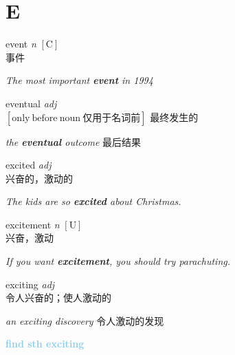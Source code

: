\section{E}

\item[] {
    \lettrine{event}{}  
    \textit{n} 
    $\mathrm{[C]}$ 
    \\
    事件

    \textit{The most important \textbf{event} in 1994}

} 

\item[] {
    \lettrine{eventual}{}  
    \textit{adj} 
    \\
    $\mathrm{[ only \ before \ noun \ \mbox{仅用于名词前}]}$ 
    最终发生的

    \textit{the \textbf{eventual} outcome} 最后结果

} 

\item[] {
    \lettrine{excited}{}  
    \textit{adj} \\
    兴奋的，激动的

    \textit{The kids are so \textbf{excited} about Christmas.}

} 

\item[] {
    \lettrine{excitement}{}  
    \textit{n} 
    $\mathrm{[U]}$ \\
    兴奋，激动

    \textit{If you want \textbf{excitement}, you should try parachuting.}

} 

\item[] {
    \lettrine{exciting}{}  
    \textit{adj} \\
    令人兴奋的；使人激动的

    \textit{an exciting discovery} 令人激动的发现

    \textbf {
        \textcolor{SkyBlue} {
            find sth exciting
        }
    }

} 